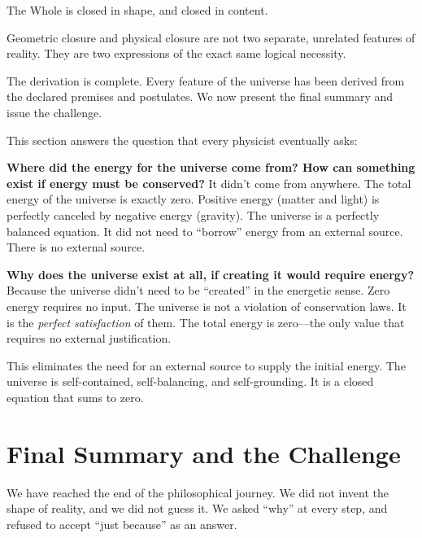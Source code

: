\documentclass[11pt]{article}
\theoremstyle{canonstyle}
\begin{document}
\begin{keyresult}
The Whole is closed in shape, and closed in content.
\end{keyresult}

Geometric closure and physical closure are not two separate, unrelated features of reality. They are two expressions of the exact same logical necessity. 

The derivation is complete. Every feature of the universe has been derived from the declared premises and postulates. We now present the final summary and issue the challenge.

\bigskip

\begin{realization}
This section answers the question that every physicist eventually asks:

\medskip

\textbf{Where did the energy for the universe come from? How can something exist if energy must be conserved?}
It didn't come from anywhere. The total energy of the universe is exactly zero. Positive energy (matter and light) is perfectly canceled by negative energy (gravity). The universe is a perfectly balanced equation. It did not need to ``borrow'' energy from an external source. There is no external source.

\textbf{Why does the universe exist at all, if creating it would require energy?}
Because the universe didn't need to be ``created'' in the energetic sense. Zero energy requires no input. The universe is not a violation of conservation laws. It is the \emph{perfect satisfaction} of them. The total energy is zero---the only value that requires no external justification.

\medskip

This eliminates the need for an external source to supply the initial energy. The universe is self-contained, self-balancing, and self-grounding. It is a closed equation that sums to zero.
\end{realization}

\newpage

\section{Final Summary and the Challenge}

We have reached the end of the philosophical journey. We did not invent the shape of reality, and we did not guess it. We asked ``why'' at every step, and refused to accept ``just because'' as an answer. 
\end{document}
